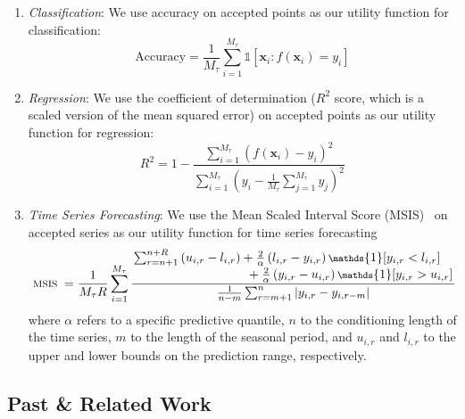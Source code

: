 \begin{enumerate}
    \item \textit{Classification}: We use accuracy on accepted points as our utility function for classification:
    \begin{equation}
        \text{Accuracy} = \frac{1}{M_\tau}\sum_{i=1}^{M_\tau} \mathds{1}[\bm{x}_i : f(\bm{x}_i) = y_i]
    \end{equation}
    \item \textit{Regression}: We use the coefficient of determination ($R^2$ score, which is a scaled version of the mean squared error) on accepted points as our utility function for regression:
     \begin{equation}
        R^2= 1 - \frac{\sum_{i=1}^{M_\tau} (f(\bm{x}_i) - y_i)^2}{\sum_{i=1}^{M_\tau} (y_i - \frac{1}{M_\tau}\sum_{j=1}^{M_\tau} y_j)^2}
    \end{equation}
    \item \textit{Time Series Forecasting}: We use the Mean Scaled Interval Score (MSIS)~\cite{gneiting2007strictly} on accepted series as our utility function for time series forecasting
    \begin{equation}
    \fontsize{7.75pt}{7.75pt}
    \text { MSIS }= \frac{1}{M_\tau R}\sum_{i=1}^{M_\tau} \frac{ \splitfrac{ \sum_{r=n+1}^{n+R}\left(u_{i,r}-l_{i,r}\right) +\frac{2}{\alpha}\left(l_{i,r}-y_{i,r}\right) \mathds{1}[y_{i,r}<l_{i,r}]}{ +\frac{2}{\alpha}\left(y_{i,r}-u_{i,r}\right)  \mathds{1}[y_{i,r}>u_{i,r}] } }{\frac{1}{n-m} \sum_{r=m+1}^n\left|y_{i,r}-y_{i,r-m}\right|}
    \end{equation}
    where $\alpha$ refers to a specific predictive quantile, $n$ to the conditioning length of the time series, $m$ to the length of the seasonal period, and $u_{i,r}$ and $l_{i,r}$ to the upper and lower bounds on the prediction range, respectively.
\end{enumerate}

\subsection{Past \& Related Work} 

